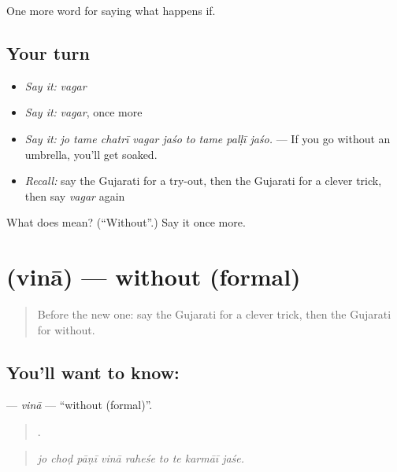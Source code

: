 \begin{grammarlens}[title={What you've built}]
One more word for saying what happens if.
\end{grammarlens}

\subsection*{Your turn}
\begin{itemize}
\raggedright
  \item \emph{Say it:} \emph{vagar}
  \item \emph{Say it:} \emph{vagar}, once more
  \item \emph{Say it:} \emph{jo tame chatrī vagar jaśo to tame palḷī jaśo.} — If you go without an umbrella, you'll get soaked.
  \item \emph{Recall:} say the Gujarati for a try-out, then the Gujarati for a clever trick, then say \emph{vagar} again
\end{itemize}

\begin{tcolorbox}[breakable,colback=teal!4,colframe=teal!35!black,title={Before you move on}]
What does  mean? (\textquotedblleft{}Without\textquotedblright{}.) Say it once more.
\end{tcolorbox}
\section[\texorpdfstring{\gu{વિના} (vinā)}{વિના (vinā)}]{ (vinā) — without (formal)}

\label{lesson:GU-C546-vina}



\begin{quote}
Before the new one: say the Gujarati for a clever trick, then the Gujarati for without.
\end{quote}

\subsection*{You'll want to know: }
\textbf{} — \emph{vinā} — \textquotedblleft{}without (formal)\textquotedblright{}.

\begin{quote}
        .
\end{quote}

\begin{quote}
\emph{jo choḍ pāṇī vinā raheśe to te karmāī jaśe.}
\end{quote}

